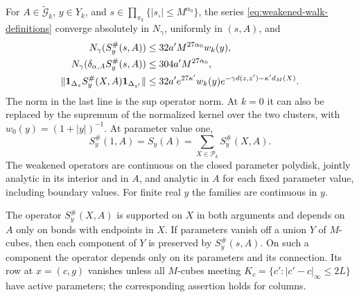 \begin{proposition}\label{prop:weakened-polymer-propagators}
For $A\in\widetilde{\mathcal G}_k$, $y\in Y_k$, and
$s\in\prod_{\pi_k}\{|s_\square|\le M^{\alpha_0}\}$, the series
\eqref{eq:weakened-walk-definitions} converge absolutely in $N_\gamma$,
uniformly in $(s,A)$, and
\begin{align}
 N_\gamma(S_y^\#(s,A))&\le32a'M^{27\alpha_0}w_k(y),
                                       \label{eq:weakened-propagator-bound}\\
 N_\gamma(\delta_{\alpha,A}S_y^\#(s,A))&\le304a'M^{27\alpha_0},\notag\\
 \|\mathbf1_{\Delta_z}S_y^\#(X,A)\mathbf1_{\Delta_{z'}}\|
   &\le32a'e^{27\kappa'}w_k(y)
       e^{-\gamma d(z,z')-\kappa'd_M(X)}.
                                       \label{eq:polymer-propagator-bound}
\end{align}
The norm in the last line is the sup operator norm. At $k=0$ it can
also be replaced by the supremum of the normalized kernel over the two
clusters, with $w_0(y)=(1+|y|)^{-1}$.
At parameter value one,
\begin{equation}\label{eq:polymer-propagator-sum}
 S_y^\#(1,A)=S_y(A)=\sum_{X\in\mathcal P_k}S_y^\#(X,A).
\end{equation}
The weakened operators are continuous on the closed parameter
polydisk, jointly analytic in its interior and in $A$, and analytic in
$A$ for each fixed parameter value, including boundary values.
For finite real $y$ the families are continuous in $y$.

The operator $S_y^\#(X,A)$ is supported on $X$ in both arguments and
depends on $A$ only on bonds with endpoints in $X$. If parameters vanish
off a union $Y$ of $M$-cubes, then each component of $Y$ is preserved by
$S_y^\#(s,A)$. On such a component the operator depends only on its
parameters and its connection. Its row at $x=(c,g)$ vanishes unless all
$M$-cubes meeting $K_c=\{c':|c'-c|_\infty\le2L\}$ have active
parameters; the corresponding assertion holds for columns.
\end{proposition}


